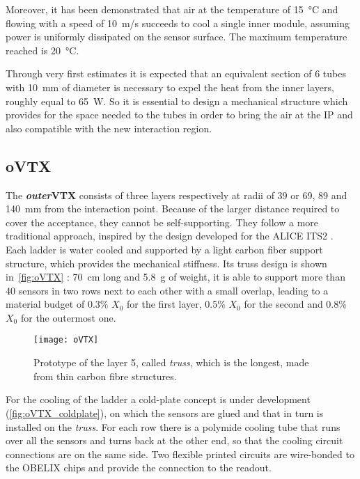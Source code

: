 Moreover, it has been demonstrated that air at the temperature of \SI{15}{\degreeCelsius} and flowing with a speed of \SI{10}{m/s} succeeds to cool a single inner module, assuming power is uniformly dissipated on the sensor surface. The maximum temperature reached is \SI{20}{\degreeCelsius}. 

Through very first estimates it is expected that an equivalent section of 6 tubes with \SI{10}{mm} of diameter is necessary to expel the heat from the inner layers, roughly equal to \SI{65}{W}. So it is essential to design a mechanical structure which provides for the space needed to the tubes in order to bring the air at the IP and also compatible with the new interaction region.


\subsection{oVTX} \label{sec:oVTX}

The \textbf{\textit{outer}VTX} consists of three layers respectively at radii of 39 or 69, 89 and \SI{140}{mm} from the interaction point. Because of the larger distance required to cover the acceptance, they cannot be self-supporting. They follow a more traditional approach, inspired by the design developed for the ALICE ITS2 \cite{Fantoni:2020iyr}. Each ladder is water cooled and supported by a light carbon fiber support structure, which provides the mechanical stiffness. Its truss design is shown in~\autoref{fig:oVTX} : \SI{70}{cm} long and \SI{5.8}{g} of weight, it is able to support more than 40 sensors in two rows next to each other with a small overlap, leading to a material budget of 0.3\% $X_{0}$ for the first layer, 0.5\% $X_{0}$ for the second and 0.8\% $X_{0}$  for the outermost one.

\begin{figure}[h!]
\centering
\texttt{[image: oVTX]}
\caption{Prototype of the layer 5, called \textit{truss}, which is the longest, made from thin carbon fibre structures.}
\label{fig:oVTX}
\end{figure}


For the cooling of the ladder a cold-plate concept is under development (\autoref{fig:oVTX_coldplate}), on which the sensors are glued and that in turn is installed on the \textit{truss}. For each row there is a polymide cooling tube that runs over all the sensors and turns back at the other end, so that the cooling circuit connections are on the same side. Two flexible printed circuits are wire-bonded to the OBELIX chips and provide the connection to the readout.


